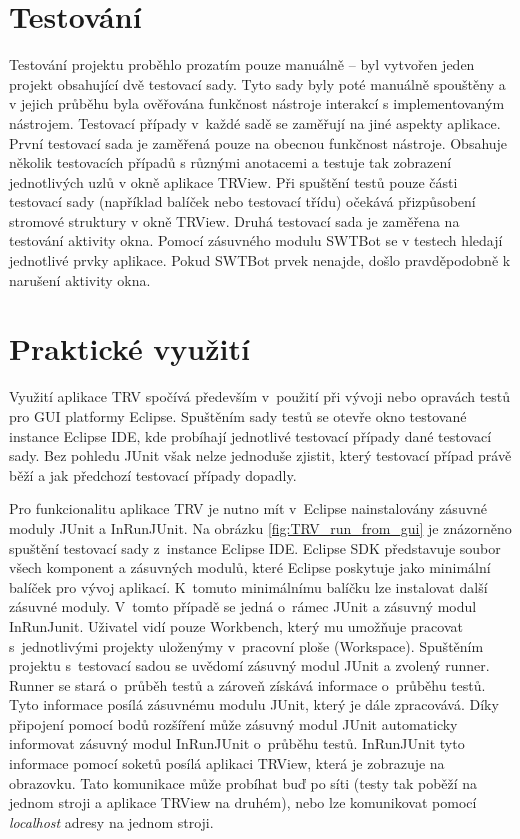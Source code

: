   \section{Testování}
  Testování projektu proběhlo prozatím pouze manuálně -- byl vytvořen jeden projekt obsahující dvě testovací sady. Tyto sady byly poté manuálně spouštěny a v jejich průběhu byla ověřována funkčnost nástroje interakcí s implementovaným nástrojem. Testovací případy v~každé sadě se zaměřují na jiné aspekty aplikace. První testovací sada je zaměřená pouze na obecnou funkčnost nástroje. Obsahuje několik testovacích případů s různými anotacemi a testuje tak zobrazení jednotlivých uzlů v okně aplikace TRView. Při spuštění testů pouze části testovací sady (například balíček nebo testovací třídu) očekává přizpůsobení stromové struktury v okně TRView. Druhá testovací sada je zaměřena na testování aktivity okna. Pomocí zásuvného modulu SWTBot se v testech hledají jednotlivé prvky aplikace. Pokud SWTBot prvek nenajde, došlo pravděpodobně k narušení aktivity okna.

  \section{Praktické využití}
  Využití aplikace TRV spočívá především v~použití při vývoji nebo opravách testů pro GUI platformy Eclipse. Spuštěním sady testů se otevře okno testované instance Eclipse IDE, kde probíhají jednotlivé testovací případy dané testovací sady. Bez pohledu JUnit však nelze jednoduše zjistit, který testovací případ právě běží a jak předchozí testovací případy dopadly.

  Pro funkcionalitu aplikace TRV je nutno mít v~Eclipse nainstalovány zásuvné moduly JUnit a InRunJUnit. Na obrázku \ref{fig:TRV_run_from_gui} je znázorněno spuštění testovací sady z~instance Eclipse IDE. Eclipse SDK představuje soubor všech komponent a zásuvných modulů, které Eclipse poskytuje jako minimální balíček pro vývoj aplikací. K~tomuto minimálnímu balíčku lze instalovat další zásuvné moduly. V~tomto případě se jedná o~rámec JUnit a zásuvný modul InRunJunit. Uživatel vidí pouze Workbench, který mu umožňuje pracovat s~jednotlivými projekty uloženýmy v~pracovní ploše (Workspace). Spuštěním projektu s~testovací sadou se uvědomí zásuvný modul JUnit a zvolený runner. Runner se stará o~průběh testů a zároveň získává informace o~průběhu testů. Tyto informace posílá zásuvnému modulu JUnit, který je dále zpracovává. Díky připojení pomocí bodů rozšíření může zásuvný modul JUnit automaticky informovat zásuvný modul InRunJUnit o~průběhu testů. InRunJUnit tyto informace pomocí soketů posílá aplikaci TRView, která je zobrazuje na obrazovku. Tato komunikace může probíhat buď po síti (testy tak poběží na jednom stroji a aplikace TRView na druhém), nebo lze komunikovat pomocí \emph{localhost} adresy na jednom stroji.

